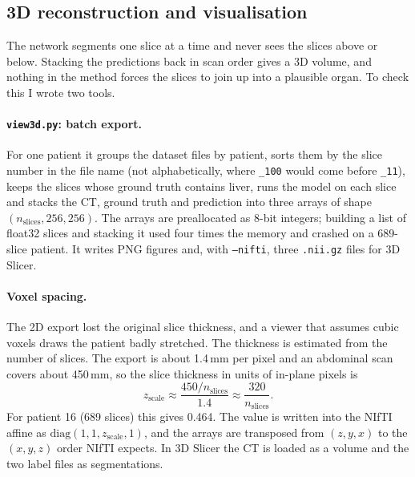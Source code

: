 \documentclass[11pt,a4paper]{article}
\newcommand{\code}[1]{\texttt{#1}}
\begin{document}
\subsection{3D reconstruction and visualisation}

The network segments one slice at a time and never sees the slices above or below.
Stacking the predictions back in scan order gives a 3D volume, and nothing in the
method forces the slices to join up into a plausible organ. To check this I wrote
two tools.

\paragraph{\code{view3d.py}: batch export.} For one patient it groups the
dataset files by patient, sorts them by the slice number in the file name (not
alphabetically, where \code{\_100} would come before \code{\_11}), keeps the
slices whose ground truth contains liver, runs the model on each slice and stacks
the CT, ground truth and prediction into three arrays of shape
$(n_{\text{slices}}, 256, 256)$. The arrays are preallocated as 8-bit integers;
building a list of float32 slices and stacking it used four times the memory and
crashed on a 689-slice patient. It writes PNG figures and, with \code{--nifti},
three \code{.nii.gz} files for 3D Slicer.

\paragraph{Voxel spacing.} The 2D export lost the original slice thickness, and a
viewer that assumes cubic voxels draws the patient badly stretched. The thickness
is estimated from the number of slices. The export is about 1.4\,mm per pixel and
an abdominal scan covers about 450\,mm, so the slice thickness in units of
in-plane pixels is
\[
z_{\text{scale}} \approx \frac{450 / n_{\text{slices}}}{1.4} \approx \frac{320}{n_{\text{slices}}} .
\]
For patient 16 (689 slices) this gives 0.464. The value is written into the NIfTI
affine as $\mathrm{diag}(1, 1, z_{\text{scale}}, 1)$, and the arrays are
transposed from $(z, y, x)$ to the $(x, y, z)$ order NIfTI expects. In 3D Slicer
the CT is loaded as a volume and the two label files as segmentations.
\end{document}
